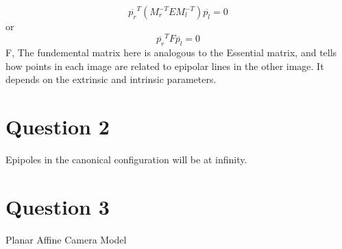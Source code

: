 \documentclass{article}
\begin{document}
\[
\overline{p_{r}}^{T} ( M_{r}^{-T}EM_{l}^{-T})\overline{p_{l}} = 0
\]
or 
\[
\overline{p_{r}}^{T} F \overline{p_{l}} = 0
\]
F, The fundemental matrix here is analogous to the Essential matrix, and tells how points in
each image are related to epipolar lines in the other image. It depends on the extrinsic and intrinsic
parameters. \\

\section*{Question 2}
Epipoles in the canonical configuration will be at infinity.

\section*{Question 3}
Planar Affine Camera Model \\
\end{document}
